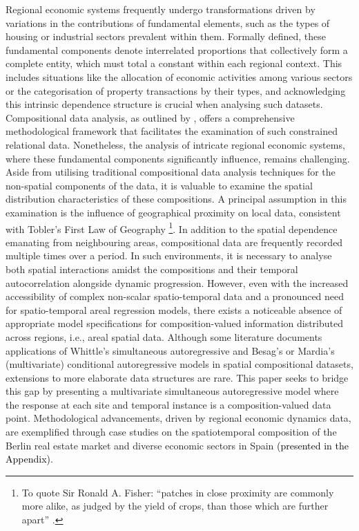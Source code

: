 \documentclass[12pt]{article}
\theoremstyle{plain}
\theoremstyle{definition}
\begin{document}
Regional economic systems frequently undergo transformations driven by variations in the contributions of fundamental elements, such as the types of housing or industrial sectors prevalent within them. Formally defined, these fundamental components denote interrelated proportions that collectively form a complete entity, which must total a constant within each regional context. This includes situations like the allocation of economic activities among various sectors or the categorisation of property transactions by their types, and acknowledging this intrinsic dependence structure is crucial when analysing such datasets. Compositional data analysis, as outlined by \citep{MR1873662}, offers a comprehensive methodological framework that facilitates the examination of such constrained relational data. Nonetheless, the analysis of intricate regional economic systems, where these fundamental components significantly influence, remains challenging. Aside from utilising traditional compositional data analysis techniques \citep{doi:10.1002/9781119976462} for the non-spatial components of the data, it is valuable to examine the spatial distribution characteristics of these compositions. A principal assumption in this examination is the influence of geographical proximity on local data, consistent with Tobler's First Law of Geography \citep{tobler}\footnote{To quote Sir Ronald A. Fisher: ``patches in close proximity are commonly more alike, as judged by the yield of crops, than those which are further apart'' \cite{fisher1935design}.}. In addition to the spatial dependence emanating from neighbouring areas, compositional data are frequently recorded multiple times over a period. In such environments, it is necessary to analyse both spatial interactions amidst the compositions and their temporal autocorrelation alongside dynamic progression. However, even with the increased accessibility of complex non-scalar spatio-temporal data and a pronounced need for spatio-temporal areal regression models, there exists a noticeable absence of appropriate model specifications for composition-valued information distributed across regions, i.e., areal spatial data. Although some literature documents applications of Whittle's simultaneous autoregressive \citep{whittle} and Besag’s or Mardia's (multivariate) conditional autoregressive models \citep{Besag:74, mardia} in spatial compositional datasets, extensions to more elaborate data structures are rare. This paper seeks to bridge this gap by presenting a multivariate simultaneous autoregressive model where the response at each site and temporal instance is a composition-valued data point. Methodological advancements, driven by regional economic dynamics data, are exemplified through case studies on the spatiotemporal composition of the Berlin real estate market and diverse economic sectors in Spain \textcolor{black}{(presented in the Appendix)}.
\end{document}
